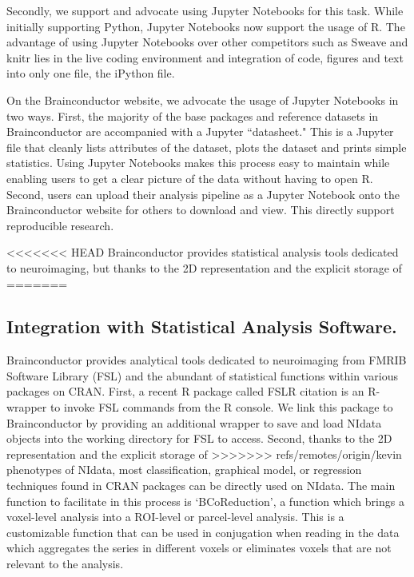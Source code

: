 \documentclass{nature}
\begin{document}
{Secondly, we support and advocate using Jupyter Notebooks for
this task. While initially supporting Python, Jupyter Notebooks now support
the usage of R. The advantage of using Jupyter Notebooks over other competitors
such as Sweave and knitr lies in the live coding environment and
integration of code, figures and text into only one file, the iPython file.

On the Brainconductor website, we advocate the usage of Jupyter Notebooks
in two ways. First, the majority of the base packages and reference datasets
in Brainconductor are accompanied with a Jupyter ``datasheet." This is a
Jupyter file that cleanly lists attributes of the dataset, plots the dataset
and prints simple statistics. Using Jupyter Notebooks makes this process easy
to maintain while enabling users to get a clear picture of the data without
having to open R. Second, users can upload their analysis pipeline as a Jupyter
Notebook onto the Brainconductor website for others to download and view. This
directly support reproducible research.



<<<<<<< HEAD
Brainconductor provides statistical analysis tools dedicated to neuroimaging,
but thanks to the 2D representation and the explicit storage of
=======
\subsection{Integration with Statistical Analysis Software.}

Brainconductor provides analytical tools dedicated to neuroimaging from
FMRIB Software Library (FSL) and the abundant of statistical functions within
various packages on CRAN. 
First, a recent R package called FSLR {\color{red}citation} is an R-wrapper to invoke
FSL commands from the R console. We link this package to Brainconductor by providing
an additional wrapper to save and load NIdata objects into the working directory for
FSL to access.
Second, thanks to the 2D representation and the explicit storage of
>>>>>>> refs/remotes/origin/kevin
phenotypes of NIdata, most classification, graphical model, or regression
techniques
found in CRAN packages can be directly used on NIdata. The main function to
facilitate in this process is `BCoReduction', a function which brings a
voxel-level
analysis into a ROI-level or parcel-level analysis. This is a customizable
function
that can be used in conjugation when reading in the data which aggregates
the series
in different voxels or eliminates voxels that are not relevant to the analysis.

}
\end{document}
